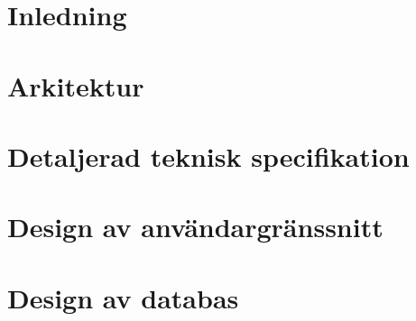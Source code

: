 \pagestyle{plain}
\setcounter{page}{1}

\chapter{Inledning}\label{cha:inledning}


\chapter{Arkitektur}\label{cha:arkitektur}


\chapter{Detaljerad teknisk specifikation}\label{cha:tekspec}


%

\chapter{Design av användargränssnitt}\label{cha:gui}


\chapter{Design av databas}\label{cha:databas}


%
